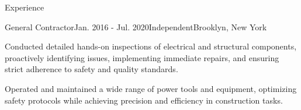 \documentclass{resume}
\begin{document}
\begin{rSection}{Experience}
\begin{rSubsection}{General Contractor}{Jan. 2016 - Jul. 2020}{Independent}{Brooklyn, New York}
            \item Conducted detailed hands-on inspections of electrical and
                structural components, proactively identifying issues,
                implementing immediate repairs, and ensuring strict adherence
                to safety and quality standards.
            \item Operated and maintained a wide range of power tools and
                equipment, optimizing safety protocols while achieving
                precision and efficiency in construction tasks.
        \end{rSubsection}

\end{rSection}
\end{document}
